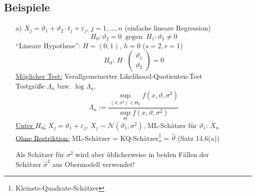 \documentclass[a4paper,11pt,twoside,titlepage]{article}
\newcommand\NN{ \mathcal{N} } %
\begin{document}
\subsection{Beispiele}
\begin{itemize}
\item[a)] $X_j=\vartheta_1+\vartheta_2\cdot t_j+\varepsilon_j$, $j=1,\ldots,n$ (einfache lineare Regression)
\[H_0:\vartheta_2=0\ \mbox{ gegen }\ H_1:\vartheta_2\neq0\]
"`Lineare Hypothese"': $H=(0,1)$, $h=0$ ($s=2,r=1$)
\[H_0:\ H\cdot\left(\begin{array}{c}\vartheta_1\\\vartheta_2\end{array}\right)=0\]
\underline{Möglicher Test:} Verallgemeinerter Likelihood-Quotienten-Test\\
Testgröße $\Lambda_n$ bzw. $\log\Lambda_n$.
\[\Lambda_n:=\frac{\sup_{(\vartheta,\sigma^2)\in\Theta_0}f(x,\vartheta,\sigma^2)}{\sup_\Theta f(x,\vartheta,\sigma^2)}\]
\underline{Unter $H_0$:} $X_j=\vartheta_1+\varepsilon_j$, $X_j\sim\NN(\vartheta_1,\sigma^2)$, ML-Schätzer für $\vartheta_1$: $\bar X_n$\\
\underline{Ohne Restriktion:} ML-Schätzer = KQ-Schätzer\footnote{Kleinste-Quadrate-Schätzer} = $\hat\vartheta$ (Satz 14.6(a))

Als Schätzer für $\sigma^2$ wird aber üblicherweise in beiden Fällen der\\ Schätzer $\hat\sigma^2$ aus Obermodell verwendet!


\end{itemize}
\end{document}
